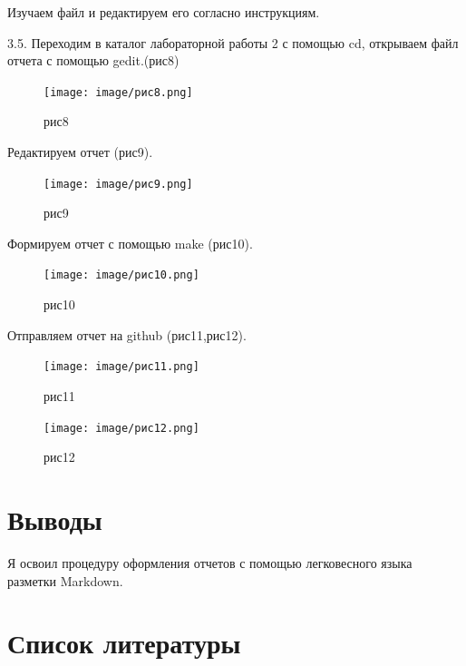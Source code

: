 \documentclass[
  english,
  russian,
  12pt,
  a4paper,
  DIV=11,
  numbers=noendperiod]{scrreprt}
\begin{document}
Изучаем файл и редактируем его согласно инструкциям.

3.5. Переходим в каталог лабораторной работы 2 с помощью cd, открываем
файл отчета с помощью gedit.(рис8)

\begin{figure}

{\centering \texttt{[image: image/рис8.png]}

}

\caption{рис8}

\end{figure}%

Редактируем отчет (рис9).

\begin{figure}

{\centering \texttt{[image: image/рис9.png]}

}

\caption{рис9}

\end{figure}%

Формируем отчет с помощью make (рис10).

\begin{figure}

{\centering \texttt{[image: image/рис10.png]}

}

\caption{рис10}

\end{figure}%

Отправляем отчет на github (рис11,рис12).

\begin{figure}

{\centering \texttt{[image: image/рис11.png]}

}

\caption{рис11}

\end{figure}%

\begin{figure}

{\centering \texttt{[image: image/рис12.png]}

}

\caption{рис12}

\end{figure}%

\chapter{Выводы}\label{ux432ux44bux432ux43eux434ux44b}

Я освоил процедуру оформления отчетов с помощью легковесного языка
разметки Markdown.

\chapter*{Список
литературы}\label{ux441ux43fux438ux441ux43eux43a-ux43bux438ux442ux435ux440ux430ux442ux443ux440ux44b}

\printbibliography[heading=none]
\end{document}
